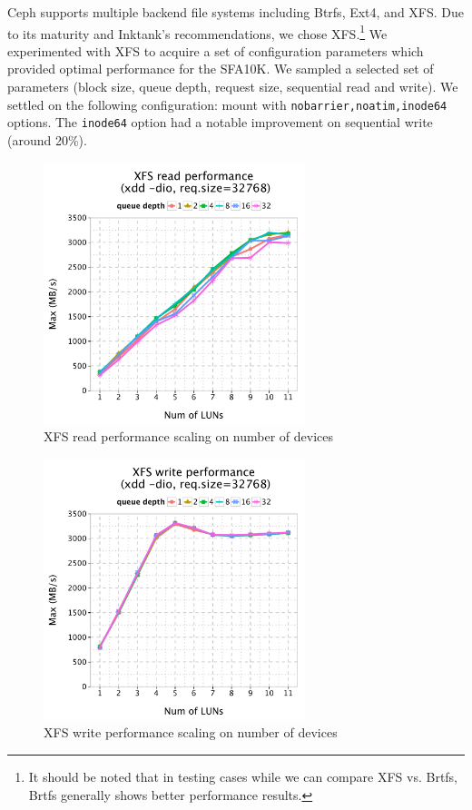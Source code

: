 \documentclass{article}
\begin{document}
Ceph supports multiple backend file systems including Btrfs, Ext4, and XFS.
Due to its maturity and Inktank's recommendations, we chose XFS.\footnote{It
should be noted that in testing cases while we can compare XFS vs.
Brtfs, Brtfs generally shows better performance results.} We experimented with
XFS to acquire a set of configuration parameters which provided optimal
performance for the SFA10K. We sampled a selected set of parameters (block size,
queue depth, request size, sequential read and write). We settled on the
following configuration: mount with \verb!nobarrier,noatim,inode64! options.
The \verb!inode64! option had a notable improvement on sequential write (around
20\%).

\begin{figure}[htb]
\centering
\centering
\includegraphics[width=3in]{data/xdd-read}
\caption{XFS read performance scaling on number of devices}
\label{fig:xfs-read}
\end{figure}

\begin{figure}[htb]
\centering
\includegraphics[width=3in]{data/xdd-write}
\caption{XFS write performance scaling on number of devices}
\label{fig:xfs-write}
\end{figure}
\end{document}
